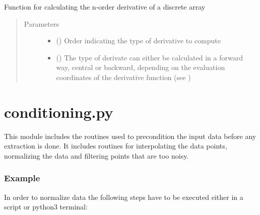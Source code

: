 \documentclass[letterpaper,10pt,english,openany, oneside]{sphinxmanual}
\begin{document}

\begin{fulllineitems}
\label{\detokenize{index:fompy.aux.get_diff}}
Function for calculating the n-order derivative of a discrete array
\begin{quote}\begin{description}
\item[{Parameters}] \leavevmode\begin{itemize}
\item {} 
 () \textendash{} Order indicating the type of derivative to compute

\item {} 
 () \textendash{} The type of derivate can either be calculated in a forward way,
central or backward, depending on the evaluation coordinates
of the derivative function (see )

\end{itemize}

\end{description}\end{quote}

\end{fulllineitems}

\label{\detokenize{index:module-fompy.conditioning}}

\section{conditioning.py}
\label{\detokenize{index:conditioning-py}}
This module includes the routines used to precondition the input data
before any extraction is done. It includes routines for interpolating the
data points, normalizing the data and filtering points that are too noisy.
\subsubsection*{Example}

In order to normalize data the following steps have to be executed either in a script or
python3 terminal:
\end{document}
